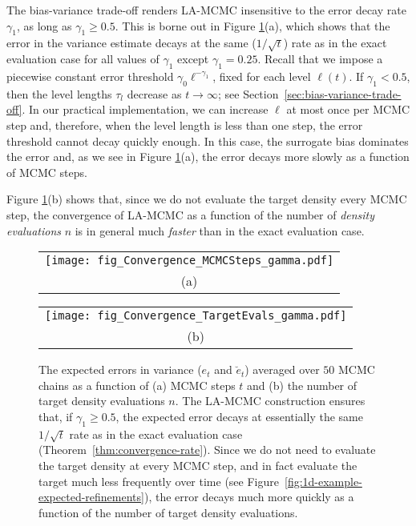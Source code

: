 The bias-variance trade-off renders LA-MCMC insensitive to the error decay rate $\gamma_1$, {as long as} $\gamma_1 \geq 0.5$. This is borne out in Figure \ref{fig:1d-example-gamma}(a), which shows that the error in the variance estimate decays at the same ($1/\sqrt{t}$) rate  as in the exact evaluation case for all values of $\gamma_1$ except $\gamma_1 = 0.25$. 
%
%
Recall that we impose a piecewise constant error threshold $\gamma_0 \ell^{-\gamma_1}$, fixed for each level $\ell(t)$. If $\gamma_1 < 0.5$, then the level lengths $\tau_l$ decrease as $t \rightarrow \infty$; see Section~\ref{sec:bias-variance-trade-off}. In our practical implementation, we can increase $\ell$ at most once per MCMC step and, therefore, when the level length is less than one step, the error threshold cannot decay quickly enough. In this case, the surrogate bias dominates the error and, as we see in Figure \ref{fig:1d-example-gamma}(a), the error decays more slowly as a function of MCMC steps. 

Figure \ref{fig:1d-example-gamma}(b) shows that, since we do not evaluate the target density every MCMC step, the convergence of LA-MCMC as a function of the number of \emph{density evaluations} $n$ is in general much \emph{faster} than in the exact evaluation case.

\begin{figure}
  \centering
  \begin{tabular}{@{}c@{}}
    \texttt{[image: fig\_Convergence\_MCMCSteps\_gamma.pdf]} \\[\abovecaptionskip]
    \small (a)
  \end{tabular}

  \vspace{\floatsep}

  \begin{tabular}{@{}c@{}}
    \texttt{[image: fig\_Convergence\_TargetEvals\_gamma.pdf]} \\[\abovecaptionskip]
    \small (b)
  \end{tabular}

  \caption{The expected errors in variance ($e_t$ and $\breve{e}_t$) averaged over $50$ MCMC chains as a function of (a) MCMC steps $t$ and (b) the number of target density evaluations $n$.  The LA-MCMC construction ensures that, if $\gamma_1  \geq 0.5$, the expected error decays at essentially the same $1/\sqrt{t}$ rate as in the exact evaluation case (Theorem~\ref{thm:convergence-rate}). Since we do not need to evaluate the target density at every MCMC step, and in fact evaluate the target much less frequently over time (see Figure~\ref{fig:1d-example-expected-refinements}), the error decays much more quickly as a function of the number of target density evaluations.}
  \label{fig:1d-example-gamma}
\end{figure}

